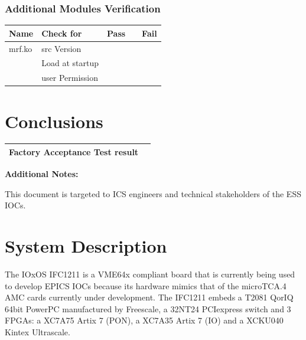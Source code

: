 \documentclass[11pt
  , a4paper
  , article
  , oneside
  , showtrims
]{memoir}
\begin{document}
\subsection{Additional Modules Verification}
\begin{table}[!hb]
	\centering
	\begin{tabular}{p{} p{} p{} p{} p{}}\rowcolor{gray!10}
		Name            & Check for        & \multicolumn{1}{c}{Pass} & & \multicolumn{1}{c}{Fail} \\\hline
		mrf.ko          & src Version      & \multicolumn{1}{c}{\checkbox} & & \multicolumn{1}{c}{\checkbox} \\
		                & Load at startup  & \multicolumn{1}{c}{\checkbox} & & \multicolumn{1}{c}{\checkbox} \\
		                & user Permission  & \multicolumn{1}{c}{\checkbox} & & \multicolumn{1}{c}{\checkbox} \\
	\end{tabular}
\end{table}
\FloatBarrier


\newpage
\chapter{Conclusions}
\begin{table}[!hb]
	\centering\large
	\begin{tabular}{|>{\raggedright}p{}|p{}|}\firsthline
		Factory Acceptance Test result &  \\\hline
	\end{tabular}
\end{table}
\normalsize
\begin{center}\bfseries{Additional Notes:} \hrulefill \end{center}



\iffalse

This document is targeted to ICS engineers and technical stakeholders of the ESS IOCs. %

\chapter{System Description}
The IOxOS IFC1211 is a VME64x compliant board that is currently being used to develop EPICS IOCs because its hardware mimics that of the microTCA.4 AMC cards currently under development.
The IFC1211 embeds a T2081 QorIQ 64bit PowerPC manufactured by Freescale, a 32NT24 PCIexpress switch and 3 FPGAs: a XC7A75 Artix 7 (PON), a XC7A35 Artix 7 (IO) and a XCKU040 Kintex Ultrascale.
\end{document}
